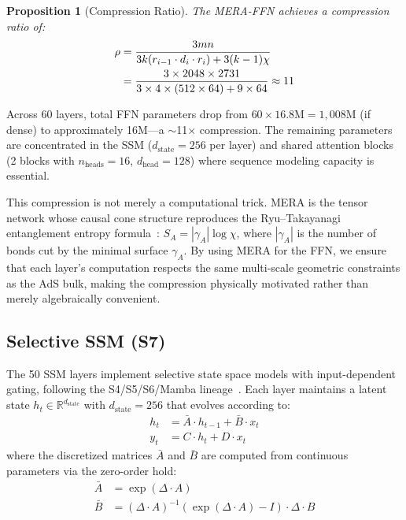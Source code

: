 \documentclass[11pt,a4paper,twocolumn]{article}
\newtheorem{proposition}{Proposition}
\begin{document}
\begin{proposition}[Compression Ratio]
The MERA-FFN achieves a compression ratio of:
\begin{align}
\rho &= \frac{3mn}{3k(r_{i-1} \cdot d_i \cdot r_i) + 3(k-1)\chi} \notag \\
     &= \frac{3 \times 2048 \times 2731}{3 \times 4 \times (512 \times 64) + 9 \times 64} \approx 11
\end{align}
\end{proposition}
\noindent
Across 60 layers, total FFN parameters drop from $60 \times 16.8\mathrm{M} = 1{,}008\mathrm{M}$ (if dense) to approximately 16M---a $\sim$11$\times$ compression.
The remaining parameters are concentrated in the SSM ($d_{\mathrm{state}} = 256$ per layer) and shared attention blocks (2 blocks with $n_{\mathrm{heads}} = 16$, $d_{\mathrm{head}} = 128$) where sequence modeling capacity is essential.

This compression is not merely a computational trick.
MERA is the tensor network whose causal cone structure reproduces the Ryu--Takayanagi entanglement entropy formula~\cite{swanson2014}: $S_A = |\gamma_A| \log \chi$, where $|\gamma_A|$ is the number of bonds cut by the minimal surface $\gamma_A$.
By using MERA for the FFN, we ensure that each layer's computation respects the same multi-scale geometric constraints as the AdS bulk, making the compression physically motivated rather than merely algebraically convenient.

\subsection{Selective SSM (S7)}

The 50 SSM layers implement selective state space models with input-dependent gating, following the S4/S5/S6/Mamba lineage~\cite{gu2023mamba}.
Each layer maintains a latent state $h_t \in \mathbb{R}^{d_{\mathrm{state}}}$ with $d_{\mathrm{state}} = 256$ that evolves according to:
\begin{align}
h_t &= \bar{A} \cdot h_{t-1} + \bar{B} \cdot x_t \label{eq:ssm_state} \\
y_t &= C \cdot h_t + D \cdot x_t \label{eq:ssm_output}
\end{align}
where the discretized matrices $\bar{A}$ and $\bar{B}$ are computed from continuous parameters via the zero-order hold:
\begin{align}
\bar{A} &= \exp(\Delta \cdot A) \label{eq:ssm_discretize_a} \\
\bar{B} &= (\Delta \cdot A)^{-1}(\exp(\Delta \cdot A) - I) \cdot \Delta \cdot B \label{eq:ssm_discretize_b}
\end{align}
\end{document}
